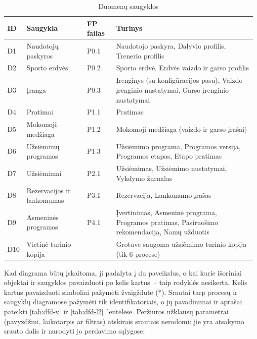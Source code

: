 \begin{table}[H]
\centering
\caption{Duomenų saugyklos}\label{tab:dfd-saugyklos}
\small
\begin{tabular}{@{}l>{\raggedright\arraybackslash}p{3.6cm}l>{\raggedright\arraybackslash}p{8.4cm}@{}}
\toprule
\textbf{ID} & \textbf{Saugykla} & \textbf{FP failas} & \textbf{Turinys} \\
\midrule
D1 & Naudotojų paskyros & P0.1 & Naudotojo paskyra, Dalyvio profilis, Trenerio profilis \\
D2 & Sporto erdvės & P0.2 & Sporto erdvė, Erdvės vaizdo ir garso profilis \\
D3 & Įranga & P0.3 & Įrenginys (su konfigūracijos pasu), Vaizdo įrenginio nustatymai, Garso įrenginio nustatymai \\
D4 & Pratimai & P1.1 & Pratimas \\
D5 & Mokomoji medžiaga & P1.2 & Mokomoji medžiaga (vaizdo ir garso įrašai) \\
D6 & Užsiėmimų programos & P1.3 & Užsiėmimo programa, Programos versija, Programos etapas, Etapo pratimas \\
D7 & Užsiėmimai & P2.1 & Užsiėmimas, Užsiėmimo nustatymai, Vykdymo žurnalas \\
D8 & Rezervacijos ir lankomumas & P3.1 & Rezervacija, Lankomumo įrašas \\
D9 & Asmeninės programos & P4.1 & Įvertinimas, Asmeninė programa, Programos pratimas, Pasiruošimo rekomendacija, Namų užduotis \\
D10 & Vietinė turinio kopija & -- & Grotuve saugoma užsiėmimo turinio kopija (tik 6 procese) \\
\bottomrule
\end{tabular}
\end{table}

Kad diagrama būtų įskaitoma, ji padalyta į du paveikslus, o kai kurie
išoriniai objektai ir saugyklos pavaizduoti po kelis kartus~– taip rodyklės
nesikerta. Kelis kartus pavaizduoti simboliai pažymėti žvaigždute (*).
Srautai tarp procesų ir saugyklų diagramose pažymėti tik
identifikatoriais, o jų pavadinimai ir aprašai pateikti \ref{tab:dfd-v} ir
\ref{tab:dfd-l2}~lentelėse. Peržiūros užklausų parametrai (pavyzdžiui, laikotarpis ar filtras)
atskirais srautais nerodomi: jie yra atsakymo srauto dalis ir nurodyti jo
perdavimo sąlygose.

